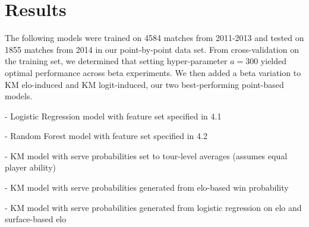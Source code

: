 \documentclass[chapterprefix=false]{report}
\begin{document}







\section{Results}

The following models were trained on 4584 matches from 2011-2013 and tested on 1855 matches from 2014 in our point-by-point data set. From cross-validation on the training set, we determined that setting hyper-parameter $a=300$ yielded optimal performance across beta experiments. We then added a beta variation to KM elo-induced and KM logit-induced, our two best-performing point-based models.

\begin{description}[leftmargin=2.5cm, labelindent=2.5cm]
\item[LR] - Logistic Regression model with feature set specified in 4.1

\item[Random Forest] - Random Forest model with feature set specified in 4.2

\item[Equivalent] - KM model with serve probabilities set to tour-level averages (assumes equal player ability)

\item[elo-induced] - KM model with serve probabilities generated from elo-based win probability

\item[logit-induced] - KM model with serve probabilities generated from logistic regression on elo and surface-based elo
\end{description}
\end{document}
